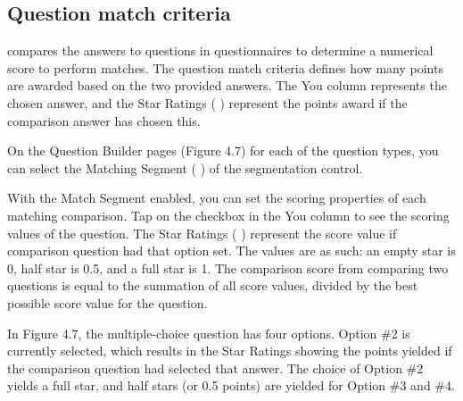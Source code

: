\subsection{Question match criteria}
\label{sec:matchcriterua}
\Friending{} compares the answers to questions in questionnaires to determine a numerical score to perform matches.  The question match criteria defines how many points are awarded based on the two provided answers.   The You column represents the chosen answer, and the Star Ratings ( ) represent the points award if the comparison answer has chosen this.  

On the Question Builder pages (Figure 4.7) for each of the question types, you can select the Matching Segment ( ) of the segmentation control.   

With the Match Segment enabled, you can set the scoring properties of each matching comparison.  Tap on the checkbox in the You column to see the scoring values of the question.  The Star Ratings ( ) represent the score value if comparison question had that option set.  The values are as such: an empty star is 0, half star is 0.5, and a full star is 1.  The comparison score from comparing two questions is equal to the summation of all score values, divided by the best possible score value for the question.

In Figure 4.7, the multiple-choice question has four options.  Option \#2 is currently selected, which results in the Star Ratings showing the points yielded if the comparison question had selected that answer.  The choice of Option \#2 yields a full star, and half stars (or 0.5 points) are yielded for Option \#3 and \#4.   
